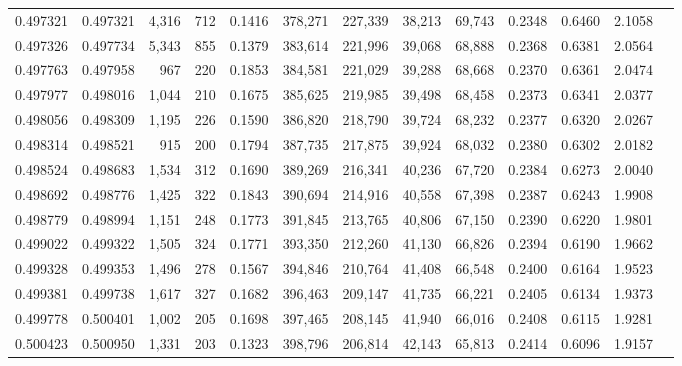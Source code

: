 \begin{tabular}{rrrrrrrrrrrrr}
0.497321 & 0.497321 & 4,316 &   712 &                                     0.1416 & 378,271 & 227,339 &  38,213 &  69,743 & 0.2348 & 0.6460 & 2.1058 \\
0.497326 & 0.497734 & 5,343 &   855 &                                     0.1379 & 383,614 & 221,996 &  39,068 &  68,888 & 0.2368 & 0.6381 & 2.0564 \\
0.497763 & 0.497958 &   967 &   220 &                                     0.1853 & 384,581 & 221,029 &  39,288 &  68,668 & 0.2370 & 0.6361 & 2.0474 \\
0.497977 & 0.498016 & 1,044 &   210 &                                     0.1675 & 385,625 & 219,985 &  39,498 &  68,458 & 0.2373 & 0.6341 & 2.0377 \\
0.498056 & 0.498309 & 1,195 &   226 &                                     0.1590 & 386,820 & 218,790 &  39,724 &  68,232 & 0.2377 & 0.6320 & 2.0267 \\
0.498314 & 0.498521 &   915 &   200 &                                     0.1794 & 387,735 & 217,875 &  39,924 &  68,032 & 0.2380 & 0.6302 & 2.0182 \\
0.498524 & 0.498683 & 1,534 &   312 &                                     0.1690 & 389,269 & 216,341 &  40,236 &  67,720 & 0.2384 & 0.6273 & 2.0040 \\
0.498692 & 0.498776 & 1,425 &   322 &                                     0.1843 & 390,694 & 214,916 &  40,558 &  67,398 & 0.2387 & 0.6243 & 1.9908 \\
0.498779 & 0.498994 & 1,151 &   248 &                                     0.1773 & 391,845 & 213,765 &  40,806 &  67,150 & 0.2390 & 0.6220 & 1.9801 \\
0.499022 & 0.499322 & 1,505 &   324 &                                     0.1771 & 393,350 & 212,260 &  41,130 &  66,826 & 0.2394 & 0.6190 & 1.9662 \\
0.499328 & 0.499353 & 1,496 &   278 &                                     0.1567 & 394,846 & 210,764 &  41,408 &  66,548 & 0.2400 & 0.6164 & 1.9523 \\
0.499381 & 0.499738 & 1,617 &   327 &                                     0.1682 & 396,463 & 209,147 &  41,735 &  66,221 & 0.2405 & 0.6134 & 1.9373 \\
0.499778 & 0.500401 & 1,002 &   205 &                                     0.1698 & 397,465 & 208,145 &  41,940 &  66,016 & 0.2408 & 0.6115 & 1.9281 \\
0.500423 & 0.500950 & 1,331 &   203 &                                     0.1323 & 398,796 & 206,814 &  42,143 &  65,813 & 0.2414 & 0.6096 & 1.9157 \\

\end{tabular}
